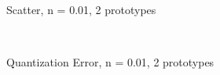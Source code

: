 \documentclass[10pt,a4paper]{article}
\begin{document}
\begin{figure}
  \centering
{} \\
  \caption{Scatter, n = 0.01, 2 prototypes}
  \label{fig:n001_k2}
\end{figure}

\begin{figure}
  \centering
{} \\
  \caption{Quantization Error, n = 0.01, 2 prototypes}
  \label{fig:n001_k2_learning}
\end{figure}
\end{document}

